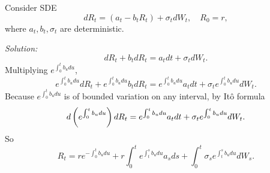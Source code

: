 \begin{exam}
    Consider SDE
    \begin{equation*}
        dR_t = (a_t - b_tR_t) + \sigma_t dW_t,\quad R_0 = r,
    \end{equation*}
    where $a_t,b_t,\sigma_t$ are deterministic.

    \noindent \emph{Solution:} 
    \begin{equation*}
        dR_t + b_tdR_t = a_tdt + \sigma_t dW_t.
    \end{equation*}
    Multiplying $e^{\int_0^t b_u du}$,
    \begin{equation*}
        e^{\int_0^t b_u du}dR_t + e^{\int_0^t b_u du}b_tdR_t = e^{\int_0^t b_u du}a_tdt + \sigma_te^{\int_0^t b_u du} dW_t.
    \end{equation*}
    Because $e^{\int_0^t b_u du}$ is of bounded variation on any interval, by It\^o formula
    \begin{equation*}
        d \left(e^{\int_0^t b_u du}\right)dR_t = e^{\int_0^t b_u du}a_tdt + \sigma_te^{\int_0^t b_u du} dW_t.
    \end{equation*}
    So
    \begin{equation*}
        R_t = re^{-\int_0^t b_u du} + r \int_0^t e^{\int_t^s b_u du}a_sds + \int_0^t\sigma_se^{\int_t^s b_u du} dW_s.
    \end{equation*}
\end{exam}

